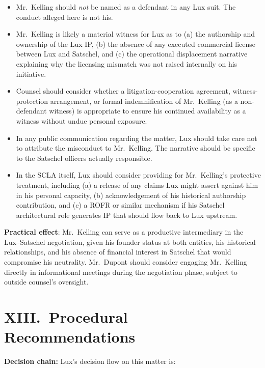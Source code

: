 \documentclass[11pt,letterpaper]{article}
\begin{document}
\begin{itemize}[leftmargin=1.5em,itemsep=0.1em]
\item Mr.\ Kelling should \emph{not} be named as a defendant in any
Lux suit. The conduct alleged here is not his.
\item Mr.\ Kelling is likely a material witness for Lux as to (a) the
authorship and ownership of the Lux IP, (b) the absence of any
executed commercial license between Lux and Satschel, and (c) the
operational displacement narrative explaining why the licensing
mismatch was not raised internally on his initiative.
\item Counsel should consider whether a litigation-cooperation
agreement, witness-protection arrangement, or formal indemnification
of Mr.\ Kelling (as a non-defendant witness) is appropriate to
ensure his continued availability as a witness without undue
personal exposure.
\item In any public communication regarding the matter, Lux should
take care not to attribute the misconduct to Mr.\ Kelling. The
narrative should be specific to the Satschel officers actually
responsible.
\item In the SCLA itself, Lux should consider providing for Mr.\
Kelling's protective treatment, including (a) a release of any
claims Lux might assert against him in his personal capacity, (b)
acknowledgement of his historical authorship contribution, and (c) a
ROFR or similar mechanism if his Satschel architectural role
generates IP that should flow back to Lux upstream.
\end{itemize}

\textbf{Practical effect}: Mr.\ Kelling can serve as a productive
intermediary in the Lux--Satschel negotiation, given his founder
status at both entities, his historical relationships, and his
absence of financial interest in Satschel that would compromise his
neutrality. Mr.\ Dupont should consider engaging Mr.\ Kelling
directly in informational meetings during the negotiation phase,
subject to outside counsel's oversight.

\section*{XIII.\ Procedural Recommendations}

\textbf{Decision chain:} Lux's decision flow on this matter is:
\end{document}
